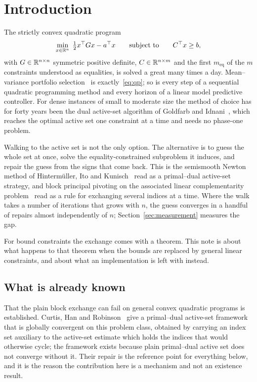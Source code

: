 \section{Introduction}
\label{sec:intro}

The strictly convex quadratic program
\begin{equation}
  \min_{x \in \mathbb{R}^n} \; \tfrac12 x^{\top} G x - a^{\top} x
  \qquad \text{subject to} \qquad C^{\top} x \ge b,
  \label{eq:qp}
\end{equation}
with $G \in \mathbb{R}^{n \times n}$ symmetric positive definite, $C \in \mathbb{R}^{n \times m}$
and the first $m_{\mathrm{eq}}$ of the $m$ constraints understood as equalities,
is solved a great many times a day. Mean--variance portfolio
selection~\cite{markowitz1952} is exactly~\eqref{eq:qp}; so is every step of a
sequential quadratic programming method and every horizon of a linear model
predictive controller. For dense instances of small to moderate size the method of
choice has for forty years been the dual active-set algorithm of Goldfarb and
Idnani~\cite{goldfarb1982,goldfarb1983}, which reaches the optimal active set one
constraint at a time and needs no phase-one problem.

Walking to the active set is not the only option. The alternative is to guess the
whole set at once, solve the equality-constrained subproblem it induces, and
repair the guess from the signs that come back. This is the semismooth Newton
method of Hinterm\"uller, Ito and Kunisch~\cite{hintermuller2002} read as a
primal--dual active-set strategy, and block principal pivoting on the associated
linear complementarity problem~\cite{judice1994,murty1988,cottle1992} read as a
rule for exchanging several indices at a time. Where the walk takes a number of
iterations that grows with $n$, the guess converges in a handful of repairs
almost independently of $n$; Section~\ref{sec:measurement} measures the gap.

For bound constraints the exchange comes with a theorem. This note is about what
happens to that theorem when the bounds are replaced by general linear
constraints, and about what an implementation is left with instead.

\subsection{What is already known}
\label{ssec:known}

That the plain block exchange can fail on general convex quadratic programs is
established. Curtis, Han and Robinson~\cite{curtis2015pdas} give a primal--dual
active-set framework that is globally convergent on this problem class, obtained
by carrying an index set auxiliary to the active-set estimate which holds the
indices that would otherwise cycle; the framework exists because plain
primal--dual active set does not converge without it. Their repair is the
reference point for everything below, and it is the reason the contribution here
is a mechanism and not an existence result.

